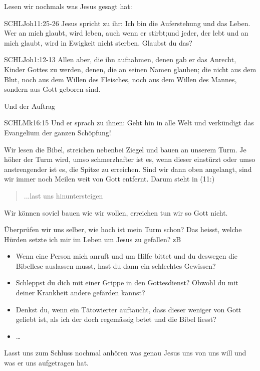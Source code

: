 \documentclass[14pt]{../../inc/mybib}
\newcommand{\q}[1]{\blockquote{#1}}
\newenvironment{block}[1][]{%
  \vspace{1.5em}%
  \noindent\textbf{#1}\par%
  \vspace{0.0em}%
}{%
  \vspace{1em}%
}
\begin{document}
\begin{block}
    Lesen wir nochmals was Jesus gesagt hat:
    \begin{bibelbox}{SCHL}{Joh}{11:25-26}
        Jesus spricht zu ihr: Ich bin die Auferstehung und das Leben. Wer an mich glaubt, wird leben, auch wenn er stirbt;und jeder, der lebt und an mich glaubt, wird in Ewigkeit nicht sterben. Glaubst du das?
    \end{bibelbox} 
    \begin{bibelbox}{SCHL}{Joh}{1:12-13}
        Allen aber, die ihn aufnahmen, denen gab er das Anrecht, Kinder Gottes zu werden, denen, die an seinen Namen glauben;
        die nicht aus dem Blut, noch aus dem Willen des Fleisches, noch aus dem Willen des Mannes, sondern aus Gott geboren sind.
    \end{bibelbox}     
    Und der Auftrag
    \begin{bibelbox}{SCHL}{Mk}{16:15}
        Und er sprach zu ihnen: Geht hin in alle Welt und verkündigt das Evangelium der ganzen Schöpfung!
    \end{bibelbox} 
    Wir lesen die Bibel, streichen nebenbei Ziegel und bauen an unserem Turm. Je höher der Turm wird, umso schmerzhafter ist es, wenn dieser einstürzt oder umso anstrengender ist es, die Spitze zu erreichen. Sind wir dann oben angelangt, sind wir immer noch Meilen weit von Gott entfernt. Darum steht in (11:) \q{...last uns hinuntersteigen}. Wir können soviel bauen wie wir wollen, erreichen tun wir so Gott nicht.

    Überprüfen wir uns selber, wie hoch ist mein Turm schon? Das heisst, welche Hürden setzte ich mir im Leben um Jesus zu gefallen? zB 
    \begin{itemize}
        \item Wenn eine Person mich anruft und um Hilfe bittet und du deswegen die Bibellese auslassen musst, hast du dann ein schlechtes Gewissen?
        \item Schleppst du dich mit einer Grippe in den Gottesdienst? Obwohl du mit deiner Krankheit andere gefärden kannst?
        \item Denkst du, wenn ein Tätowierter auftaucht, dass dieser weniger von Gott geliebt ist, als ich der doch regemässig betet und die Bibel liesst?
        \item \dots
    \end{itemize}
            
\end{block}
    Lasst uns zum Schluss nochmal anhören was genau Jesus uns von uns will und was er uns aufgetragen hat. 
\end{document}
